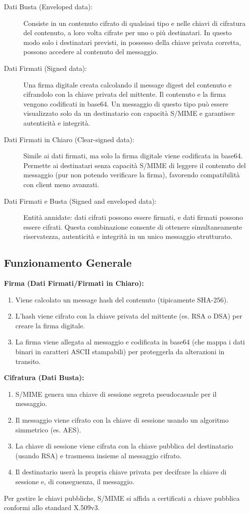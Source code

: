 \begin{description}
    \item[Dati Busta (Enveloped data):] Consiste in un contenuto cifrato di qualsiasi tipo e nelle chiavi di cifratura del contenuto, a loro volta cifrate per uno o più destinatari. In questo modo solo i destinatari previsti, in possesso della chiave privata corretta, possono accedere al contenuto del messaggio.
    \item[Dati Firmati (Signed data):] Una firma digitale creata calcolando il message digest del contenuto e cifrandolo con la chiave privata del mittente. Il contenuto e la firma vengono codificati in base64. Un messaggio di questo tipo può essere visualizzato solo da un destinatario con capacità S/MIME e garantisce autenticità e integrità.
    \item[Dati Firmati in Chiaro (Clear-signed data):] Simile ai dati firmati, ma solo la firma digitale viene codificata in base64. Permette ai destinatari senza capacità S/MIME di leggere il contenuto del messaggio (pur non potendo verificare la firma), favorendo compatibilità con client meno avanzati.
    \item[Dati Firmati e Busta (Signed and enveloped data):] Entità annidate: dati cifrati possono essere firmati, e dati firmati possono essere cifrati. Questa combinazione consente di ottenere simultaneamente riservatezza, autenticità e integrità in un unico messaggio strutturato.
\end{description}

\subsection{Funzionamento Generale}
\textbf{Firma (Dati Firmati/Firmati in Chiaro):}
\begin{enumerate}
    \item Viene calcolato un message hash del contenuto (tipicamente SHA-256).
    \item L'hash viene cifrato con la chiave privata del mittente (es. RSA o DSA) per creare la firma digitale.
    \item La firma viene allegata al messaggio e codificata in base64 (che mappa i dati binari in caratteri ASCII stampabili) per proteggerla da alterazioni in transito.
\end{enumerate}

\textbf{Cifratura (Dati Busta):}
\begin{enumerate}
    \item S/MIME genera una chiave di sessione segreta pseudocasuale per il messaggio.
    \item Il messaggio viene cifrato con la chiave di sessione usando un algoritmo simmetrico (es. AES).
    \item La chiave di sessione viene cifrata con la chiave pubblica del destinatario (usando RSA) e trasmessa insieme al messaggio cifrato.
    \item Il destinatario userà la propria chiave privata per decifrare la chiave di sessione e, di conseguenza, il messaggio.
\end{enumerate}
Per gestire le chiavi pubbliche, S/MIME si affida a certificati a chiave pubblica conformi allo standard X.509v3.

